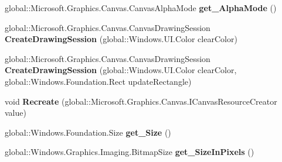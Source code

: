 \begin{DoxyCompactItemize}
global\+::\+Microsoft.\+Graphics.\+Canvas.\+Canvas\+Alpha\+Mode {\bfseries get\+\_\+\+Alpha\+Mode} ()
\item 
\mbox{\label{interface_microsoft_1_1_graphics_1_1_canvas_1_1_u_i_1_1_xaml_1_1_i_canvas_image_source_a2712dc7b5d96ee15e13c5e52958f1cd4}} 
global\+::\+Microsoft.\+Graphics.\+Canvas.\+Canvas\+Drawing\+Session {\bfseries Create\+Drawing\+Session} (global\+::\+Windows.\+U\+I.\+Color clear\+Color)
\item 
\mbox{\label{interface_microsoft_1_1_graphics_1_1_canvas_1_1_u_i_1_1_xaml_1_1_i_canvas_image_source_abc05c809912de3ae92ccfebc505385d6}} 
global\+::\+Microsoft.\+Graphics.\+Canvas.\+Canvas\+Drawing\+Session {\bfseries Create\+Drawing\+Session} (global\+::\+Windows.\+U\+I.\+Color clear\+Color, global\+::\+Windows.\+Foundation.\+Rect update\+Rectangle)
\item 
\mbox{\label{interface_microsoft_1_1_graphics_1_1_canvas_1_1_u_i_1_1_xaml_1_1_i_canvas_image_source_a15fd97a0021f7ecd409f478ba91e851c}} 
void {\bfseries Recreate} (global\+::\+Microsoft.\+Graphics.\+Canvas.\+I\+Canvas\+Resource\+Creator value)
\item 
\mbox{\label{interface_microsoft_1_1_graphics_1_1_canvas_1_1_u_i_1_1_xaml_1_1_i_canvas_image_source_a7d8bd30d0a04d8736e7b731f51beda90}} 
global\+::\+Windows.\+Foundation.\+Size {\bfseries get\+\_\+\+Size} ()
\item 
\mbox{\label{interface_microsoft_1_1_graphics_1_1_canvas_1_1_u_i_1_1_xaml_1_1_i_canvas_image_source_a0ac817b62686169754a46a9175fd1f94}} 
global\+::\+Windows.\+Graphics.\+Imaging.\+Bitmap\+Size {\bfseries get\+\_\+\+Size\+In\+Pixels} ()
\item 
\mbox{\label{interface_microsoft_1_1_graphics_1_1_canvas_1_1_u_i_1_1_xaml_1_1_i_canvas_image_source_af71f6e17450c14d8d80205d22900491c}} 

\end{DoxyCompactItemize}
